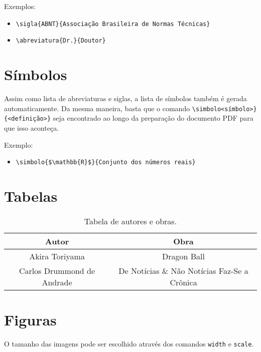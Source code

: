 Exemplos:

\begin{itemize}
    \item \verb|\sigla{ABNT}{Associação Brasileira de Normas Técnicas}|
    \item \verb|\abreviatura{Dr.}{Doutor}|
\end{itemize}


\section{Símbolos}

Assim como lista de abreviaturas e siglas, a lista de símbolos também é gerada automaticamente. Da mesma maneira, basta que o comando \verb|\simbolo<símbolo>}| \verb|{<definição>}| seja encontrado ao longo da preparação do documento PDF para que isso aconteça.

Exemplo:

\begin{itemize}
    \item \verb|\simbolo{$\mathbb{R}$}{Conjunto dos números reais}|
\end{itemize}


\section{Tabelas}

\begin{table}[h]
    \centering
    \begin{tabular}{c | c}
        \hline
        Autor & Obra \\
        \hline
        Akira Toriyama & Dragon Ball \\
        Carlos Drummond de Andrade & De Notícias \& Não Notícias Faz-Se a Crônica
    \end{tabular}
    \caption[Tabela]{Tabela de autores e obras.}
    \label{table:1}
\end{table}

\section{Figuras}

O tamanho das imagens pode ser escolhido através dos comandos \verb|width| e \verb|scale|.

